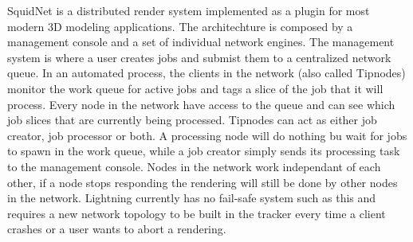 SquidNet is a distributed render system implemented as a plugin for most modern 3D modeling applications. The architechture is composed by a management console and a set of individual network engines. The management system is where a user creates jobs and submist them to a centralized network queue. In an automated process, the clients in the network (also called Tipnodes) monitor the work queue for active jobs and tags a slice of the job that it will process. Every node in the network have access to the queue and can see which job slices that are currently being processed. Tipnodes can act as either job creator, job processor or both. A processing node will do nothing bu wait for jobs to spawn in the work queue, while a job creator simply sends its processing task to the management console. Nodes in the network work independant of each other, if a node stops responding the rendering will still be done by other nodes in the network. Lightning currently has no fail-safe system such as this and requires a new network topology to be built in the tracker every time a client crashes or a user wants to abort a rendering. 







